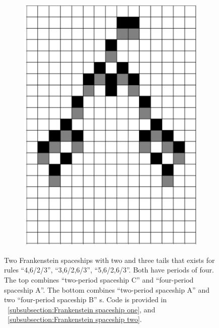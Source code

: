 \documentclass[12pt]{article}
\numberwithin{figure}{section} %
\begin{document}
\begin{figure}[H]
\begin{subfigure}{0.19\textwidth}
     		\includegraphics[width=\linewidth]{Section4/26.4}
     		\subcaption{}
   	\end{subfigure}
   	\setcounter{subfigure}{0}
	\caption[Frankenstein spaceships]{Two Frankenstein spaceships with two and three tails that exists for rules “4,6/2/3”, “3,6/2,6/3”, “5,6/2,6/3”. Both have periods of four. The top combines “two-period spaceship C” and “four-period spaceship A”. The bottom combines “two-period spaceship A” and two “four-period spaceship B” s. Code is provided in ~\ref{subsubsection:Frankenstein spaceship one}, and ~\ref{subsubsection:Frankenstein spaceship two}.}
	\label{fig:Frankenstein spaceships}
\end{figure}
\end{document}
